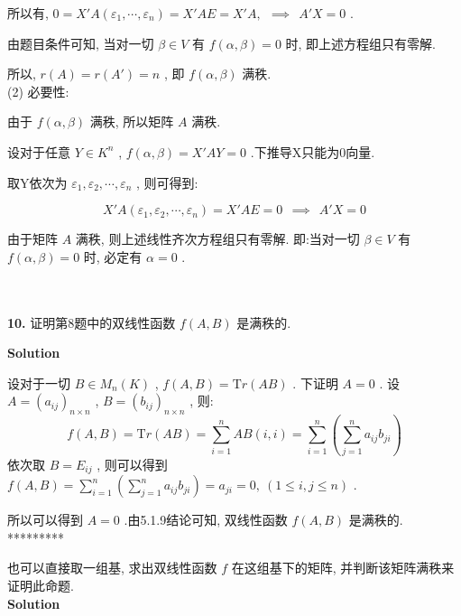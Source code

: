 \documentclass[11pt,a4paper,openany,oneside]{book}
\newcommand{\Tr}{\mathrm Tr}
\newcommand\Solution{\noindent\textbf{\textsf{Solution}}\par\medskip}
\begin{document}
所以有,  $ 0 = X'A(\varepsilon_1, \cdots, \varepsilon_n) = X'AE = X'A, \ \ \implies \ \ A'X = 0  $ .

由题目条件可知, 当对一切 $ \beta \in V $ 有 $ f(\alpha, \beta) = 0 $ 时, 即上述方程组只有零解. 

所以,  $ r(A) = r(A') = n $ , 即 $ f(\alpha, \beta) $ 满秩. \\

(2) 必要性:

由于 $ f(\alpha, \beta) $ 满秩, 所以矩阵 $ A $ 满秩. 

设对于任意 $ Y \in K^n $ ,  $ f(\alpha, \beta) = X'AY = 0 $ .下推导X只能为0向量.

取Y依次为 $ \varepsilon_1, \varepsilon_2, \cdots, \varepsilon_n $ , 则可得到:

 $$  X'A(\varepsilon_1, \varepsilon_2, \cdots, \varepsilon_n) = X'AE = 0 \ \ \implies \ \ A'X =0   $$ 

由于矩阵 $ A $ 满秩, 则上述线性齐次方程组只有零解. 即:当对一切 $ \beta \in V $ 有 $ f(\alpha, \beta) = 0 $ 时, 必定有 $ \alpha = 0 $ . \\  \\  \\






\begin{myexample}
	\textbf{10.} 证明第8题中的双线性函数 $ f(A,B) $ 是满秩的. 
\end{myexample}
\Solution  

设对于一切 $ B \in M_n(K) $ ,  $ f(A, B) = \Tr(AB) $ . 下证明 $ A=0 $ . 设 $ A = (a_{ij})_{n \times n} $ ,  $ B = (b_{ij})_{n \times n} $ , 则:
 $$  f(A,B) = \Tr(AB) = \sum\limits_{i=1}^n AB(i,i) = \sum\limits_{i=1}^n(\sum\limits_{j=1}^n a_{ij}b_{ji})  $$ 
依次取 $ B = E_{ij} $ , 则可以得到 $ f(A, B) = \sum\limits_{i=1}^n(\sum\limits_{j=1}^n a_{ij}b_{ji}) = a_{ji} = 0, \ (1 \leq i, j \leq n) $ .

所以可以得到 $ A = 0 $ .由5.1.9结论可知, 双线性函数 $ f(A,B) $ 是满秩的.  \\  

*********

也可以直接取一组基, 求出双线性函数 $ f $ 在这组基下的矩阵, 并判断该矩阵满秩来证明此命题. \\


\Solution
\end{document}

